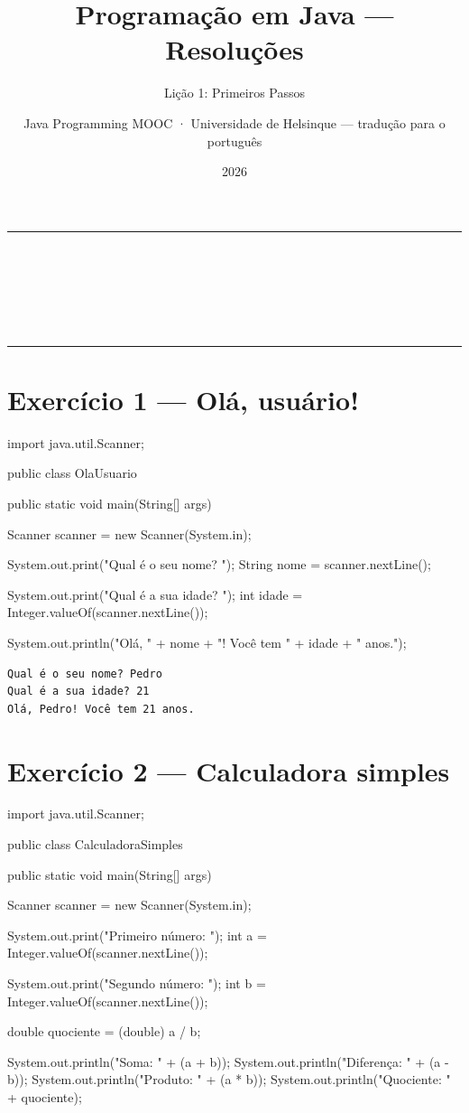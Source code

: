 \documentclass[11pt,a4paper]{article}
\title{Programação em Java — Resoluções}
\subtitle{Lição 1: Primeiros Passos}
\author{Java Programming MOOC · Universidade de Helsinque — tradução para o português}
\date{2026}
\makeatletter
\renewcommand{\maketitle}{%
  \begin{center}
    {\color{javaRule}\rule{\linewidth}{1pt}}\\[6pt]
    {\Huge\sffamily\bfseries\color{javaOrange} \@title}\\[6pt]
    \ifx\@subtitle\undefined\else
      {\Large\sffamily\color{javaDeep} \@subtitle}\\[4pt]
    \fi
    {\small\sffamily\color{gray} \@author}\\[2pt]
    {\small\sffamily\color{gray} \@date}\\[6pt]
    {\color{javaRule}\rule{\linewidth}{1pt}}
  \end{center}
  \vspace{1em}
}
\makeatother
\begin{document}
\maketitle
\tableofcontents
\vspace{1.5em}

\section{Exercício 1 --- Olá, usuário!}

\begin{javacode}
import java.util.Scanner;

public class OlaUsuario {
    public static void main(String[] args) {
        Scanner scanner = new Scanner(System.in);

        System.out.print("Qual é o seu nome? ");
        String nome = scanner.nextLine();

        System.out.print("Qual é a sua idade? ");
        int idade = Integer.valueOf(scanner.nextLine());

        System.out.println("Olá, " + nome + "! Você tem " + idade + " anos.");
    }
}
\end{javacode}

\begin{destaque}
\begin{verbatim}
Qual é o seu nome? Pedro
Qual é a sua idade? 21
Olá, Pedro! Você tem 21 anos.
\end{verbatim}
\end{destaque}

\section{Exercício 2 --- Calculadora simples}

\begin{javacode}
import java.util.Scanner;

public class CalculadoraSimples {
    public static void main(String[] args) {
        Scanner scanner = new Scanner(System.in);

        System.out.print("Primeiro número: ");
        int a = Integer.valueOf(scanner.nextLine());

        System.out.print("Segundo número: ");
        int b = Integer.valueOf(scanner.nextLine());

        double quociente = (double) a / b;

        System.out.println("Soma: " + (a + b));
        System.out.println("Diferença: " + (a - b));
        System.out.println("Produto: " + (a * b));
        System.out.println("Quociente: " + quociente);
    }
}
\end{javacode}
\end{document}
